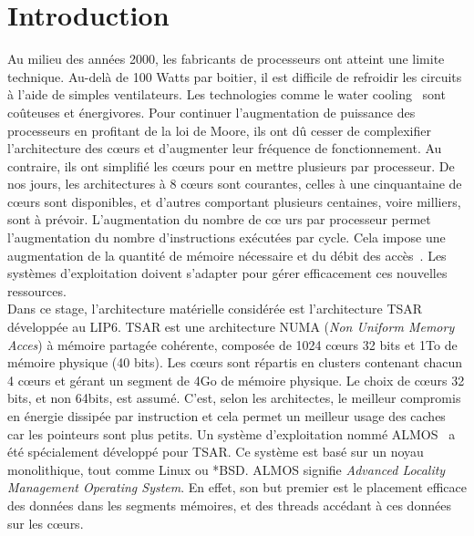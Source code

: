 \chapter{Introduction}

  Au milieu des années 2000, les fabricants de processeurs ont atteint une
  limite technique.  Au-delà de 100 Watts par boitier, il est difficile de
  refroidir les circuits à l'aide de simples ventilateurs. Les technologies
  comme le water cooling~\citep{googleXXXXdatacenters} sont coûteuses et
  énergivores.  Pour continuer l'augmentation de puissance des processeurs en
  profitant de la loi de Moore, ils ont dû cesser de complexifier l'architecture
  des c\oe urs et d'augmenter leur fréquence de fonctionnement. Au contraire,
  ils ont simplifié les c\oe urs pour en mettre plusieurs par processeur.  De
  nos jours, les architectures à 8 c\oe urs sont courantes, celles à une
  cinquantaine de c\oe urs sont disponibles, et d'autres comportant plusieurs
  centaines, voire milliers, sont à prévoir.  L'augmentation du nombre de c\oe
  urs par processeur permet l'augmentation du nombre d'instructions exécutées
  par cycle.  Cela impose une augmentation de la quantité de mémoire nécessaire
  et du débit des accès~\citep{hp2012z820, puget2013z9pe}. Les systèmes
  d'exploitation doivent s'adapter pour gérer efficacement ces nouvelles
  ressources.\\

  Dans ce stage, l'architecture matérielle considérée est l'architecture
  TSAR~\citep{greiner2009tsar} développée au LIP6. TSAR est une architecture
  NUMA (\textit{Non Uniform Memory Acces}) à mémoire partagée cohérente,
  composée de 1024 c\oe urs 32 bits et 1To de mémoire physique (40 bits).  Les
  c\oe urs sont répartis en clusters contenant chacun 4 c\oe urs et gérant un
  segment de 4Go de mémoire physique. Le choix de c\oe urs 32 bits, et non
  64bits, est assumé. C'est, selon les architectes, le meilleur compromis en
  énergie dissipée par instruction et cela permet un meilleur usage des caches
  car les pointeurs sont plus petits.  Un système d'exploitation nommé
  ALMOS~\citep{almaless2011almos} a été spécialement développé pour TSAR. Ce
  système est basé sur un noyau monolithique, tout comme Linux ou *BSD. ALMOS
  signifie \textit{Advanced Locality Management Operating System}. En effet, son
  but premier est le placement efficace des données dans les segments mémoires,
  et des threads accédant à ces données sur les c\oe urs.\\

